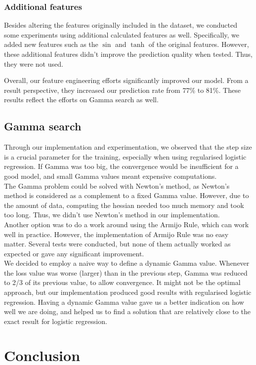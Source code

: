 \documentclass[10pt,conference,compsocconf]{IEEEtran}
\begin{document}
\subsubsection{Additional features}
Besides altering the features originally included in the dataset, we conducted some experiments using additional calculated features as well. Specifically, we added new features such as the $\sin$ and $\tanh$ of the original features. However, these additional features didn't improve the prediction quality when tested. Thus, they were not used.

Overall, our feature engineering efforts significantly improved our model. From a result perspective, they increased our prediction rate from 77\% to 81\%. These results reflect the efforts on Gamma search as well.

\subsection{Gamma search}

Through our implementation and experimentation, we observed that the step size is a crucial parameter for the training, especially when using regularised logistic regression. If Gamma was too big, the convergence would be insufficient for a good model, and small Gamma values meant expensive computations. \\
The Gamma problem could be solved with Newton’s method, as Newton’s method is considered as a complement to a fixed Gamma value. However, due to the amount of data, computing the hessian needed too much memory and took too long. Thus, we didn't use Newton’s method in our implementation. \\
Another option was to do a work around using the Armijo Rule, which can work well in practice. However, the implementation of Armijo Rule was no easy matter. Several tests were conducted, but none of them actually worked as expected or gave any significant improvement. \\
We decided to employ a naive way to define a dynamic Gamma value. Whenever the loss value was worse (larger) than in the previous step, Gamma was reduced to 2/3 of its previous value, to allow convergence. It might not be the optimal approach, but our implementation produced good results with regularised logistic regression.
Having a dynamic Gamma value gave us a better indication on how well we are doing, and helped us to find a solution that are relatively close to the exact result for logistic regression. 


\section{Conclusion}
\end{document}
